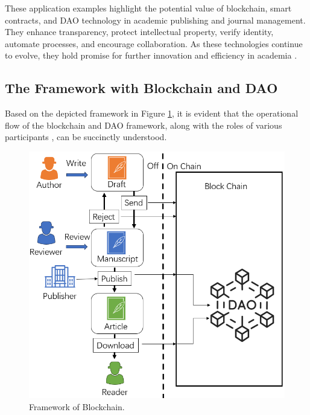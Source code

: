 \documentclass[lettersize,journal]{IEEEtran}
\begin{document}
These application examples highlight the potential value of blockchain, smart contracts, and DAO technology in academic publishing and journal management. They enhance transparency, protect intellectual property, verify identity, automate processes, and encourage collaboration. As these technologies continue to evolve, they hold promise for further innovation and efficiency in academia \cite{vacca2021systematic}.


\subsection{The Framework with Blockchain and DAO}

Based on the depicted framework in Figure \ref{fig:frameworkofblockchain}, it is evident that the operational flow of the blockchain and DAO framework, along with the roles of various participants \cite{10459713}, can be succinctly understood. 

\begin{figure}[h!]
  \centering
  \includegraphics[width=\linewidth]{assets/workflow.png}
  \caption{Framework of Blockchain.}
  \label{fig:frameworkofblockchain}
\end{figure}
\end{document}
